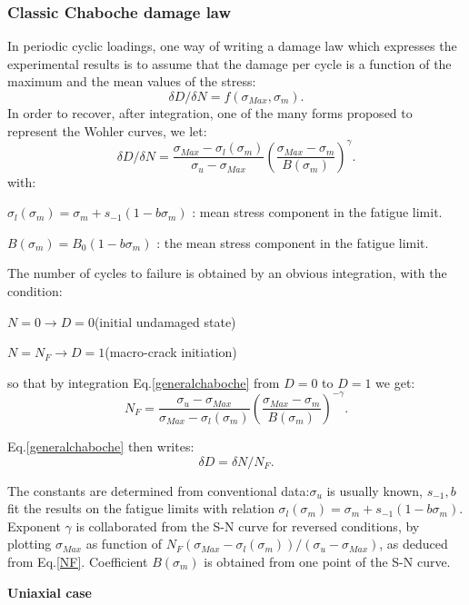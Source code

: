 \documentclass[3p,times,procedia,number]{elsarticle}
\begin{document}
\newpage
\subsubsection{Classic Chaboche damage law}

In periodic cyclic loadings, one way of writing a damage law which expresses the experimental results is to assume that the damage per cycle is a function of the maximum and the mean values of the stress:
$$\delta D/\delta N=f(\sigma_{Max},\sigma_m).$$
In order to recover, after integration, one of the many forms proposed to represent the Wohler curves, we let:
\begin{equation}
\delta D/\delta N=\frac{\sigma_{Max}-\sigma_l(\sigma_m)}{\sigma_{u}-\sigma_{Max}}(\frac{\sigma_{Max}-\sigma_m}{B(\sigma_m)})^{\gamma}.
\label{generalchaboche}
\end{equation}
with:

$\sigma_l(\sigma_m)=\sigma_m+s_{-1}(1-b\sigma_m)$ : mean stress component in the fatigue limit.

$B(\sigma_m)=B_0(1-b\sigma_m)$ : the mean stress component in the fatigue limit.

The number of cycles to failure is obtained by an obvious integration, with the condition:

$N=0 \to D=0$(initial undamaged state)

$N=N_F \to D=1$(macro-crack initiation)

so that by integration Eq.\eqref{generalchaboche} from $D=0$ to $D=1$ we get:
\begin{equation}N_F=\frac{\sigma_{u}-\sigma_{Max}}{\sigma_{Max}-\sigma_l(\sigma_m)}\left(\frac{\sigma_{Max}-\sigma_m}{B(\sigma_m)}\right)^{-\gamma}.
\label{NF}
\end{equation}

Eq.\eqref{generalchaboche} then writes:
$$\delta D=\delta N/N_F.$$

The constants are determined from conventional data:$\sigma_u$ is usually known, $s_{-1},b$ fit the results on the fatigue limits with relation $\sigma_l(\sigma_m)=\sigma_m+s_{-1}(1-b\sigma_m)$. Exponent $\gamma$ is collaborated from the S-N curve for reversed conditions, by plotting $\sigma_{Max}$ as function of $N_F(\sigma_{Max}-\sigma_l(\sigma_m))/(\sigma_{u}-\sigma_{Max})$, as deduced from Eq.\eqref{NF}. Coefficient $B(\sigma_m)$ is obtained from one point of the S-N curve.

\vspace{6pt}
\textbf{Uniaxial case}
\vspace{6pt}
\end{document}
